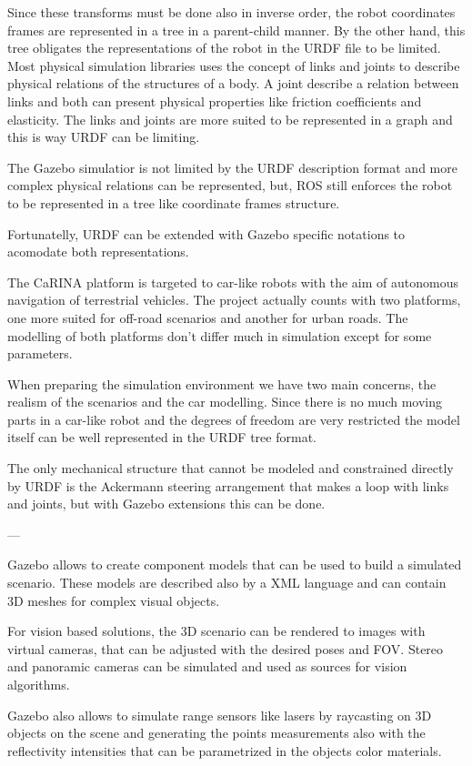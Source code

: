 Since these transforms must be done also in inverse order, the robot coordinates
frames are represented in a tree in a parent-child manner. By the other hand,
this tree obligates the representations of the robot in the URDF file to be
limited. Most physical simulation libraries uses the concept of links and joints
to describe physical relations of the structures of a body. A joint describe
a relation between links and both can present physical properties like friction
coefficients and elasticity. The links and joints are more suited to be
represented in a graph and this is way URDF can be limiting. 

The Gazebo simulatior is not limited by the URDF description format and more
complex physical relations can be represented, but, ROS still enforces the robot
to be represented in a tree like coordinate frames structure. 

Fortunatelly, URDF
can be extended with Gazebo specific notations to acomodate both
representations.

The CaRINA platform is targeted to car-like robots with the aim of autonomous
navigation of terrestrial vehicles. The project actually counts with two
platforms, one more suited for off-road scenarios and another for urban roads.
The modelling of both platforms don't differ much in simulation except for some
parameters.

When preparing the simulation environment we have two main concerns, the
realism of the scenarios and the car modelling. Since there is no much moving
parts in a car-like robot and the degrees of freedom are very restricted the
model itself can be well represented in the URDF tree format. 

The only mechanical structure that cannot be modeled and constrained directly by
URDF is the Ackermann steering arrangement that makes a loop with links and
joints, but with Gazebo extensions this can be done.



---

Gazebo allows to create component models that can be used to build a
simulated scenario. These models are described also by a XML language and can
contain 3D meshes for complex visual objects. 


For vision based solutions, the 3D scenario can be rendered to images with
virtual cameras, that can be adjusted with the desired poses and FOV. Stereo and
panoramic cameras can be simulated and used as sources for vision algorithms.

Gazebo also allows to simulate range sensors like lasers by raycasting on 3D
objects on the scene and generating the points measurements also with the
reflectivity intensities that can be parametrized in the objects color
materials.


